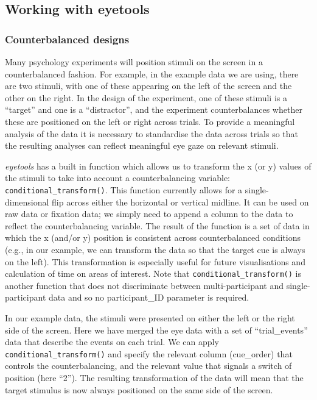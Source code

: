 \documentclass[
  man,
  floatsintext,
  longtable,
  nolmodern,
  notxfonts,
  notimes,
  colorlinks=true,linkcolor=blue,citecolor=blue,urlcolor=blue]{apa7}
\begin{document}
\subsection{Working with eyetools}\label{working-with-eyetools}

\subsubsection{Counterbalanced designs}\label{counterbalanced-designs}

Many psychology experiments will position stimuli on the screen in a
counterbalanced fashion. For example, in the example data we are using,
there are two stimuli, with one of these appearing on the left of the
screen and the other on the right. In the design of the experiment, one
of these stimuli is a ``target'' and one is a ``distractor'', and the
experiment counterbalances whether these are positioned on the left or
right across trials. To provide a meaningful analysis of the data it is
necessary to standardise the data across trials so that the resulting
analyses can reflect meaningful eye gaze on relevant stimuli.

\emph{eyetools} has a built in function which allows us to transform the
x (or y) values of the stimuli to take into account a counterbalancing
variable: \texttt{conditional\_transform()}. This function currently
allows for a single-dimensional flip across either the horizontal or
vertical midline. It can be used on raw data or fixation data; we simply
need to append a column to the data to reflect the counterbalancing
variable. The result of the function is a set of data in which the x
(and/or y) position is consistent across counterbalanced conditions
(e.g., in our example, we can transform the data so that the target cue
is always on the left). This transformation is especially useful for
future visualisations and calculation of time on areas of interest. Note
that \texttt{conditional\_transform()} is another function that does not
discriminate between multi-participant and single-participant data and
so no participant\_ID parameter is required.

In our example data, the stimuli were presented on either the left or
the right side of the screen. Here we have merged the eye data with a
set of ``trial\_events'' data that describe the events on each trial. We
can apply \texttt{conditional\_transform()} and specify the relevant
column (cue\_order) that controls the counterbalancing, and the relevant
value that signals a switch of position (here ``2''). The resulting
transformation of the data will mean that the target stimulus is now
always positioned on the same side of the screen.
\end{document}
